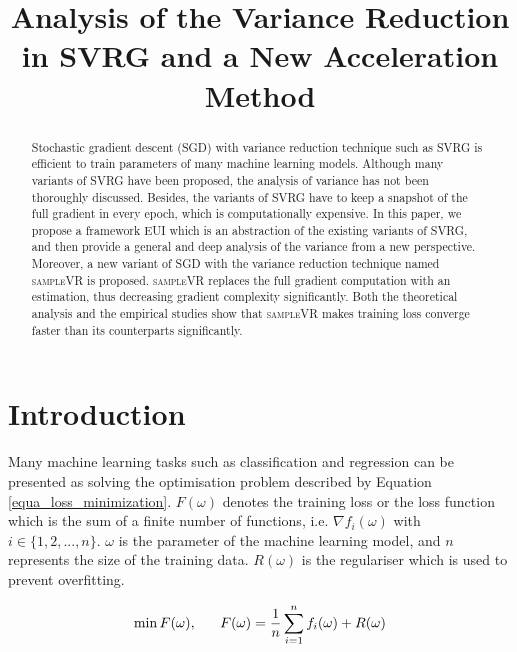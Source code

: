 \documentclass[letterpaper]{article}
\begin{document}
%
\title{Analysis of the Variance Reduction in SVRG and a New Acceleration Method}
\maketitle
\begin{abstract}
Stochastic gradient descent (SGD) with variance reduction  technique such as SVRG is efficient to train parameters of many machine learning models. Although many variants of SVRG have been proposed,  the analysis of variance has not been thoroughly discussed. Besides,  the variants of SVRG have to keep a snapshot of the full gradient in every epoch, which is computationally expensive. In this paper, we propose a framework EUI which is an abstraction of  the existing variants of SVRG, and then  provide a general and deep analysis of the variance from a new perspective. Moreover,   a new variant of SGD with the variance reduction technique named \textsc{sampleVR} is proposed. \textsc{sampleVR} replaces the full gradient computation with an estimation, thus decreasing gradient complexity significantly.  Both the theoretical analysis and the empirical studies show that \textsc{sampleVR} makes  training loss converge faster than its counterparts significantly. 
\end{abstract}

\section{Introduction}
\label{sect_introduction}
Many machine learning tasks such as classification and regression  can be  presented as solving the optimisation problem described by Equation \ref{equa_loss_minimization}. $F(\omega)$ denotes the training loss or the loss function which is the sum of a finite number of functions, i.e. $\nabla f_i(\omega)$ with $i\in\{1,2, ..., n\}$. $\omega$ is the parameter of the machine learning model, and $n$ represents the size of the training data. $R(\omega)$ is the regulariser  which is used to prevent overfitting.    

\begin{equation}
\label{equa_loss_minimization}
\min F(\omega),~~~~~F(\omega)=\frac{1}{n}\sum\limits_{i=1}^n f_i(\omega)+R(\omega)\\
\end{equation}
\end{document}
